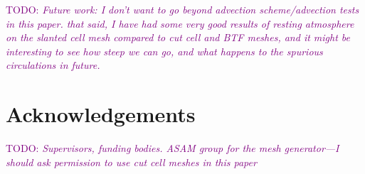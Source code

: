 \documentclass{article}
\newcommand{\TODO}[1]{\textcolor{purple}{TODO: \emph{#1}}}
\begin{document}
\TODO{Future work: I don't want to go beyond advection scheme/advection tests in this paper.  that said, I have had some very good results of resting atmosphere on the slanted cell mesh compared to cut cell and BTF meshes, and it might be interesting to see how steep we can go, and what happens to the spurious circulations in future.}

\section{Acknowledgements}
\TODO{Supervisors, funding bodies.  ASAM group for the mesh generator---I should ask permission to use cut cell meshes in this paper}



\end{document}
